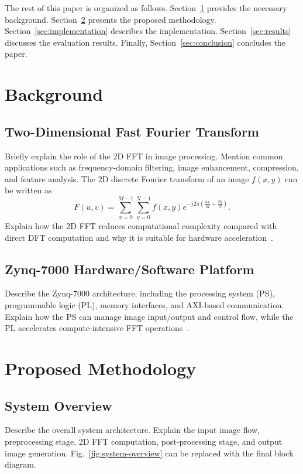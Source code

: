 \documentclass[conference]{IEEEtran}
\begin{document}
The rest of this paper is organized as follows. Section~\ref{sec:background} provides the necessary background. Section~\ref{sec:methodology} presents the proposed methodology. Section~\ref{sec:implementation} describes the implementation. Section~\ref{sec:results} discusses the evaluation results. Finally, Section~\ref{sec:conclusion} concludes the paper.

\section{Background}\label{sec:background}
\subsection{Two-Dimensional Fast Fourier Transform}
Briefly explain the role of the 2D FFT in image processing. Mention common applications such as frequency-domain filtering, image enhancement, compression, and feature analysis. The 2D discrete Fourier transform of an image $f(x,y)$ can be written as
\begin{equation}
    F(u,v)=\sum_{x=0}^{M-1}\sum_{y=0}^{N-1}f(x,y)e^{-j2\pi\left(\frac{ux}{M}+\frac{vy}{N}\right)}.
\end{equation}
Explain how the 2D FFT reduces computational complexity compared with direct DFT computation and why it is suitable for hardware acceleration~\cite{ref:cooley}.

\subsection{Zynq-7000 Hardware/Software Platform}
Describe the Zynq-7000 architecture, including the processing system (PS), programmable logic (PL), memory interfaces, and AXI-based communication. Explain how the PS can manage image input/output and control flow, while the PL accelerates compute-intensive FFT operations~\cite{ref:zynq}.

\section{Proposed Methodology}\label{sec:methodology}
\subsection{System Overview}
Describe the overall system architecture. Explain the input image flow, preprocessing stage, 2D FFT computation, post-processing stage, and output image generation. Fig.~\ref{fig:system-overview} can be replaced with the final block diagram.
\end{document}
